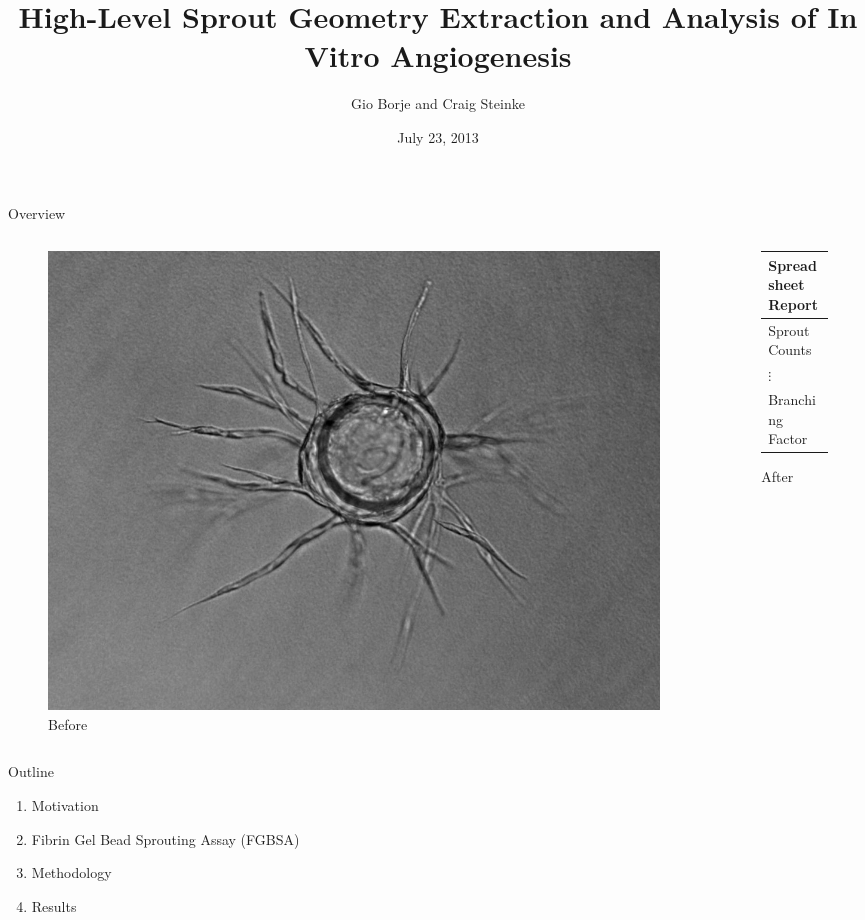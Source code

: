 \documentclass{beamer}
\author{Gio Borje and Craig Steinke}
\institute{UC Irvine}
\title{High-Level Sprout Geometry Extraction and Analysis of In Vitro Angiogenesis}
\date{July 23, 2013}
\begin{document}
\begin{frame}
	\maketitle
\end{frame}

\begin{frame}{Overview}
	\begin{columns}
	\begin{column}{0.5\textwidth}
		\begin{figure}
			\centering
			\includegraphics[width=\textwidth]{images/mono}
			\caption{Before}
		\end{figure}
	\end{column}
	\begin{column}{0.5\textwidth}
		\begin{figure}
			\centering
			\begin{tabular}{|l|}
				\hline
				\textbf{Spreadsheet Report} \\\hline
				Sprout Counts \\\hline
				$\vdots$ \\\hline
				Branching Factor \\\hline
			\end{tabular}
			\caption{After}
		\end{figure}
	\end{column}
	\end{columns}
\end{frame}

\begin{frame}{Outline}
	\begin{enumerate}
		\item Motivation
		\item Fibrin Gel Bead Sprouting Assay (FGBSA)
		\item Methodology
		\item Results
	\end{enumerate}
\end{frame}
\end{document}
